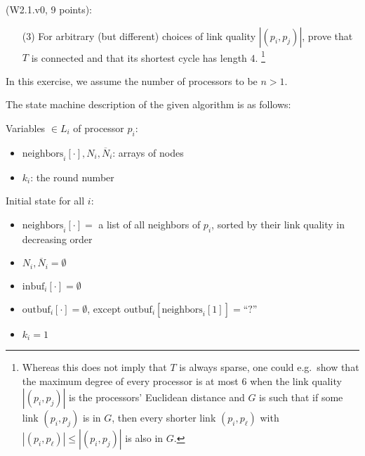 \begin{Exc}{(W2.1.v0, 9 points):}
\begin{enumerate}
\item[(3)] For arbitrary (but different) choices of link quality
$|(p_i,p_j)|$, prove that $T$ is connected and that its shortest
cycle has length 4.
\footnote{Whereas this does not imply that $T$ is always sparse,
one could e.g.\ show that the maximum degree of every processor is at
most 6 when the link quality $|(p_i,p_j)|$ is the processors' Euclidean
distance and $G$ is such that if some link $(p_i,p_j)$ is
in $G$, then every shorter link $(p_i,p_\ell)$ with $|(p_i,p_\ell)|
\leq |(p_i,p_j)|$ is also in $G$.}
\end{enumerate}
\end{Exc}

In this exercise, we assume the number of processors to be $n > 1$.

The state machine description of the given algorithm is as follows:

Variables $\in L_i$ of processor $p_i$:
\begin{itemize}
\item $\text{neighbors}_i[\cdot], N_i, \overline{N}_i$: arrays of nodes
\item $k_i$: the round number
\end{itemize}

Initial state for all $i$:
\begin{itemize}
\item $\text{neighbors}_i[\cdot] = $ a list of all neighbors of $p_i$, sorted by their
      link quality in decreasing order
\item $N_i, \overline{N}_i = \emptyset$
\item $\text{inbuf}_i[\cdot] = \emptyset$
\item $\text{outbuf}_i[\cdot] = \emptyset$, except $\text{outbuf}_i[\text{neighbors}_i[1]] = \text{``?''}$
\item $k_i = 1$
\end{itemize}

